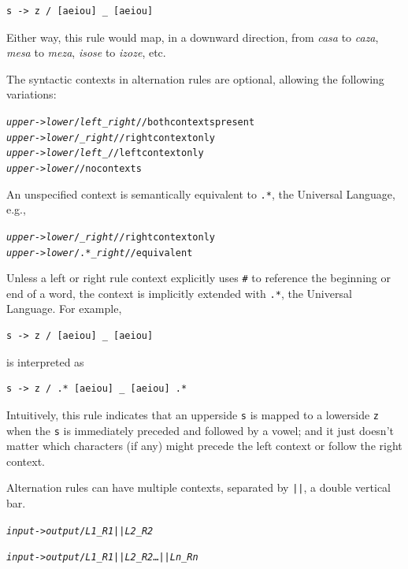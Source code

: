 \begin{Verbatim}
s -> z / [aeiou] _ [aeiou]
\end{Verbatim}

\noindent
Either way, this rule would map, in a downward direction, from \emph{casa} to \emph{caza}, \emph{mesa} to \emph{meza},
\emph{isose} to \emph{izoze}, etc.

The syntactic contexts in alternation rules are optional, allowing the following variations:

\begin{alltt}
\emph{upper} -> \emph{lower} /   \emph{left} _ \emph{right} // both contexts present
\emph{upper} -> \emph{lower} /   _ \emph{right}      // right context only
\emph{upper} -> \emph{lower} /   \emph{left} _      // left context only
\emph{upper} -> \emph{lower}                  // no contexts
\end{alltt}

\noindent
An unspecified context is semantically equivalent to \verb!.*!, the Universal
Language, e.g.,

\begin{alltt}
\emph{upper} -> \emph{lower} /    _ \emph{right}	    // right context only
\emph{upper} -> \emph{lower} / .* _ \emph{right}	    // equivalent
\end{alltt}

Unless a left or right rule context explicitly uses \verb!#! to reference the
beginning or end of a word, the context is implicitly extended with
\verb!.*!, the Universal Language.  For example,

\begin{Verbatim}
s -> z / [aeiou] _ [aeiou]
\end{Verbatim}

\noindent
is interpreted as

\begin{Verbatim}
s -> z / .* [aeiou] _ [aeiou] .*
\end{Verbatim}

\noindent
Intuitively, this rule indicates that
an upperside \texttt{s} is mapped to a lowerside \texttt{z}
when the \texttt{s} is immediately preceded and followed by a vowel; and it
just doesn't matter which characters (if any) might precede the left context or follow
the right context.

Alternation rules can have multiple contexts, separated by \texttt{||}, a double vertical bar.

\begin{alltt}
\emph{input} -> \emph{output} / \emph{L1} _ \emph{R1} || \emph{L2} _ \emph{R2}

\emph{input} -> \emph{output} / \emph{L1} _ \emph{R1} || \emph{L2} _ \emph{R2} \ldots || \emph{Ln} _ \emph{Rn}
\end{alltt}

